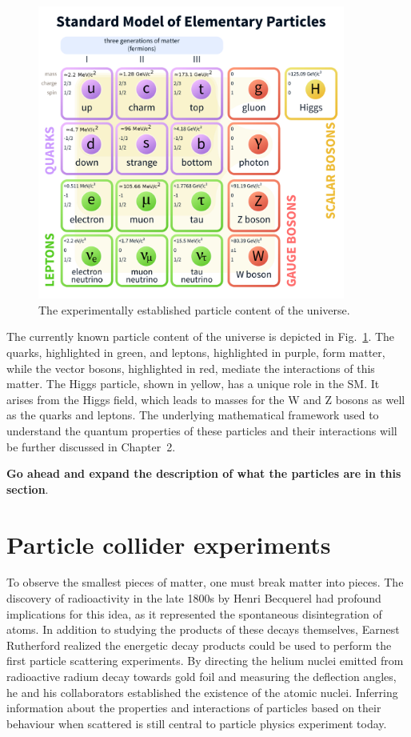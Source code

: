 \begin{figure}[htbp]
  \centering
   \includegraphics[width=0.9\textwidth]{figures/Chapter1/ChartOfParticles.png}
  \caption{
    The experimentally established particle content of the universe.
  }
 \label{fig:theparticles}
\end{figure}

The currently known particle content of the universe is depicted in Fig.~\ref{fig:theparticles}.
The quarks, highlighted in green, and leptons, highlighted in purple,
form matter, while the vector bosons, highlighted in red, mediate the 
interactions of this matter. The Higgs particle, shown in yellow,
has a unique role in the SM. It arises from the Higgs field, which
leads to masses for the W and Z bosons as well as the quarks and leptons.
The underlying mathematical framework used to understand the quantum 
properties of these particles and their interactions will be further discussed
in Chapter~2. 

\textbf{Go ahead and expand the description of what the particles are in this section}.

\section{Particle collider experiments}

To observe the smallest pieces of matter, one must break matter into pieces.
The discovery of radioactivity in the late 1800s by Henri Becquerel had
profound implications for this idea, as it represented the spontaneous
disintegration of atoms. 
In addition to studying the products of these decays themselves, 
Earnest Rutherford realized the energetic decay products could be used
to perform the first particle scattering experiments. By directing the 
helium nuclei emitted from radioactive radium decay towards gold foil
and measuring the deflection
angles, he and his collaborators established the existence of the atomic nuclei.
Inferring information about the properties and interactions of particles based on their
behaviour when scattered is still central to particle physics experiment today.

